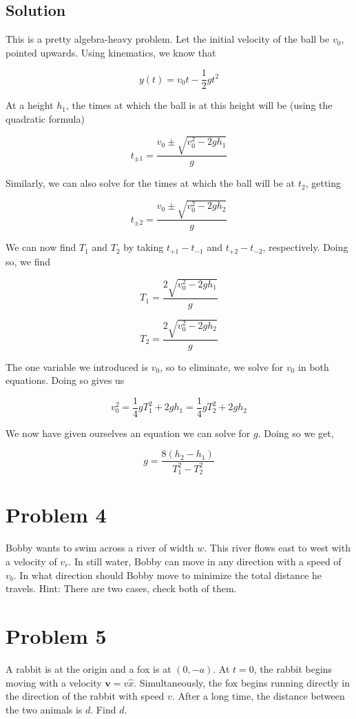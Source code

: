 \documentclass[11pt]{scrartcl}
\begin{document}
\subsection*{Solution}
This is a pretty algebra-heavy problem.
Let the initial velocity of the ball be $v_0$, pointed upwards.
Using kinematics, we know that

$$
y(t) = v_0 t - \frac{1}{2} gt^2
$$

At a height $h_1$, the times at which the ball is at this height will be (using the quadratic formula)

$$
t_{\pm 1} = \frac{v_0 \pm \sqrt{v_0^2 - 2gh_1}}{g}
$$

Similarly, we can also solve for the times at which the ball will be at $t_2$, getting

$$
t_{\pm 2} = \frac{v_0 \pm \sqrt{v_0^2 - 2gh_2}}{g}
$$

We can now find $T_1$ and $T_2$ by taking $t_{+1} - t_{-1}$ and $t_{+2} - t_{-2}$, respectively.
Doing so, we find

$$
T_1 = \frac{2 \sqrt{v_0^2 - 2gh_1}}{g}
$$

$$
T_2 = \frac{2 \sqrt{v_0^2 - 2gh_2}}{g}
$$

The one variable we introduced is $v_0$, so to eliminate, we solve for $v_0$ in both equations.
Doing so gives us

$$
v_0^2 = \frac{1}{4} gT_1^2 + 2gh_1 = \frac{1}{4} gT_2^2 + 2gh_2
$$

We now have given ourselves an equation we can solve for $g$.
Doing so we get,

$$g = \boxed{\frac{8(h_2 - h_1)}{T_1^2 - T_2^2}}$$

\newpage

\section{Problem 4}
Bobby wants to swim across a river of width $w$.
This river flows east to west with a velocity of $v_r$.
In still water, Bobby can move in any direction with a speed of $v_b$.
In what direction should Bobby move to minimize the total distance he travels.
Hint: There are two cases, check both of them.

\newpage

\section{Problem 5}
A rabbit is at the origin and a fox is at $(0, -a)$.
At $t=0$, the rabbit begins moving with a velocity $\bm{v} = v \hat{x}$.
Simultaneously, the fox begins running directly in the direction of the rabbit with speed $v$.
After a long time, the distance between the two animals is $d$.
Find $d$.
\end{document}
